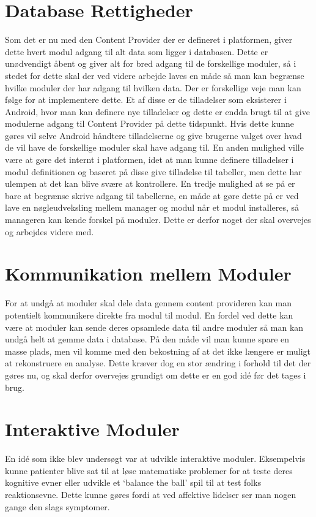 \section{Database Rettigheder}
Som det er nu med den Content Provider der er defineret i platformen, giver dette hvert modul adgang til alt data som ligger i databasen.
Dette er unødvendigt åbent og giver alt for bred adgang til de forskellige moduler, så i stedet for dette skal der ved videre arbejde laves en måde så man kan begrænse hvilke moduler der har adgang til hvilken data.
Der er forskellige veje man kan følge for at implementere dette.  
Et af disse er de tilladelser som eksisterer i Android, hvor man kan definere nye tilladelser og dette er endda brugt til at give modulerne adgang til Content Provider på dette tidspunkt.
Hvis dette kunne gøres vil selve Android håndtere tilladelserne og give brugerne valget over hvad de vil have de forskellige moduler skal have adgang til.
En anden mulighed ville være at gøre det internt i platformen, idet at man kunne definere tilladelser i modul definitionen og baseret på disse give tilladelse til tabeller, men dette har ulempen at det kan blive svære at kontrollere. 
En tredje mulighed at se på er bare at begrænse skrive adgang til tabellerne, en måde at gøre dette på er ved lave en nøgleudveksling mellem manager og modul når et modul installeres, så manageren kan kende forskel på moduler.
Dette er derfor noget der skal overvejes og arbejdes videre med. 

\section{Kommunikation mellem Moduler}
For at undgå at moduler skal dele data gennem content provideren kan man potentielt kommunikere direkte fra modul til modul.
En fordel ved dette kan være at moduler kan sende deres opsamlede data til andre moduler så man kan undgå helt at gemme data i database.
På den måde vil man kunne spare en masse plads, men vil komme med den bekostning af at det ikke længere er muligt at rekonstruere en analyse.
Dette kræver dog en stor ændring i forhold til det der gøres nu, og skal derfor overvejes grundigt om dette er en god idé før det tages i brug.

\section{Interaktive Moduler}
En idé som ikke blev undersøgt var at udvikle interaktive moduler.
Eksempelvis kunne patienter blive sat til at løse matematiske problemer for at teste deres kognitive evner eller udvikle et `balance the ball' spil til at test folks reaktionsevne.
Dette kunne gøres fordi at ved affektive lidelser ser man nogen gange den slags symptomer. 

